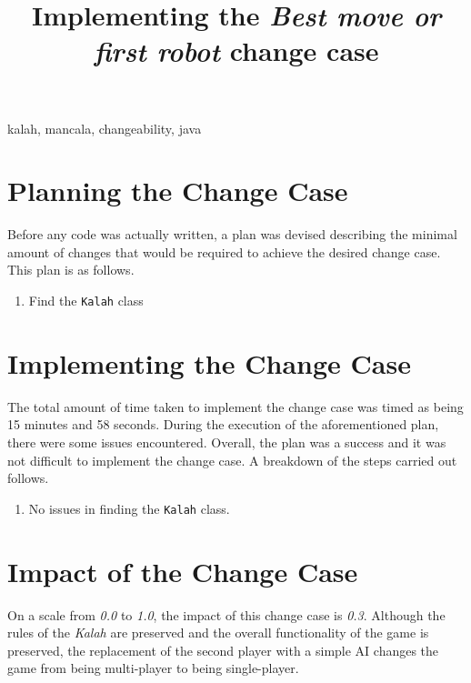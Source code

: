 \documentclass[10pt, a4paper, conference]{IEEEtran}
\begin{document}
\title{Implementing the \textit{Best move or first robot} change case}

\author{
}

\maketitle

\begin{abstract}
\end{abstract}

\begin{IEEEkeywords}
kalah, mancala, changeability, java
\end{IEEEkeywords}

\section{Planning the Change Case}
Before any code was actually written, a plan was devised describing the minimal
amount of changes that would be required to achieve the desired change case.
This plan is as follows.
\begin{enumerate}
  \item Find the \texttt{Kalah} class
\end{enumerate}

\section{Implementing the Change Case}
The total amount of time taken to implement the change case was timed as being 
15 minutes and 58 seconds. During the execution of the aforementioned plan, there were some
issues encountered. Overall, the plan was a success and it was not difficult to
implement the change case. A breakdown of the steps carried out follows. 
\begin{enumerate}
  \item No issues in finding the \texttt{Kalah} class.
\end{enumerate}

\section{Impact of the Change Case}
On a scale from \textit{0.0} to \textit{1.0}, the impact of this change case is
\textit{0.3}. Although the rules of the \textit{Kalah} are preserved and the
overall functionality of the game is preserved, the replacement of the second
player with a simple AI changes the game from being multi-player to being
single-player.
\end{document}
